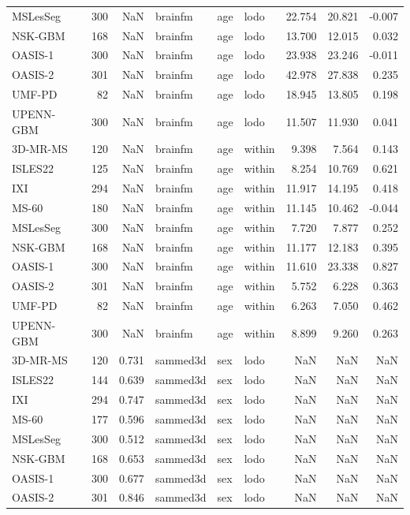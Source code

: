 \begin{tabular}{lrrlllrrr}
MSLesSeg & 300 & NaN & brainfm & age & lodo & 22.754 & 20.821 & -0.007 \\
NSK-GBM & 168 & NaN & brainfm & age & lodo & 13.700 & 12.015 & 0.032 \\
OASIS-1 & 300 & NaN & brainfm & age & lodo & 23.938 & 23.246 & -0.011 \\
OASIS-2 & 301 & NaN & brainfm & age & lodo & 42.978 & 27.838 & 0.235 \\
UMF-PD & 82 & NaN & brainfm & age & lodo & 18.945 & 13.805 & 0.198 \\
UPENN-GBM & 300 & NaN & brainfm & age & lodo & 11.507 & 11.930 & 0.041 \\
3D-MR-MS & 120 & NaN & brainfm & age & within & 9.398 & 7.564 & 0.143 \\
ISLES22 & 125 & NaN & brainfm & age & within & 8.254 & 10.769 & 0.621 \\
IXI & 294 & NaN & brainfm & age & within & 11.917 & 14.195 & 0.418 \\
MS-60 & 180 & NaN & brainfm & age & within & 11.145 & 10.462 & -0.044 \\
MSLesSeg & 300 & NaN & brainfm & age & within & 7.720 & 7.877 & 0.252 \\
NSK-GBM & 168 & NaN & brainfm & age & within & 11.177 & 12.183 & 0.395 \\
OASIS-1 & 300 & NaN & brainfm & age & within & 11.610 & 23.338 & 0.827 \\
OASIS-2 & 301 & NaN & brainfm & age & within & 5.752 & 6.228 & 0.363 \\
UMF-PD & 82 & NaN & brainfm & age & within & 6.263 & 7.050 & 0.462 \\
UPENN-GBM & 300 & NaN & brainfm & age & within & 8.899 & 9.260 & 0.263 \\
3D-MR-MS & 120 & 0.731 & sammed3d & sex & lodo & NaN & NaN & NaN \\
ISLES22 & 144 & 0.639 & sammed3d & sex & lodo & NaN & NaN & NaN \\
IXI & 294 & 0.747 & sammed3d & sex & lodo & NaN & NaN & NaN \\
MS-60 & 177 & 0.596 & sammed3d & sex & lodo & NaN & NaN & NaN \\
MSLesSeg & 300 & 0.512 & sammed3d & sex & lodo & NaN & NaN & NaN \\
NSK-GBM & 168 & 0.653 & sammed3d & sex & lodo & NaN & NaN & NaN \\
OASIS-1 & 300 & 0.677 & sammed3d & sex & lodo & NaN & NaN & NaN \\
OASIS-2 & 301 & 0.846 & sammed3d & sex & lodo & NaN & NaN & NaN \\

\end{tabular}
